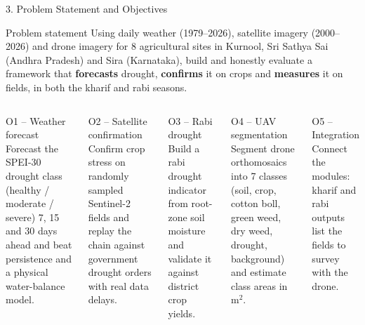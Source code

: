 \documentclass[aspectratio=169,10pt]{beamer}
\begin{document}
\begin{frame}{3. Problem Statement and Objectives}
\begin{card}{Problem statement}
\footnotesize Using daily weather (1979--2026), satellite imagery (2000--2026) and drone imagery for 8 agricultural sites in Kurnool, Sri Sathya Sai (Andhra Pradesh) and Sira (Karnataka), build and honestly evaluate a framework that \textbf{forecasts} drought, \textbf{confirms} it on crops and \textbf{measures} it on fields, in both the kharif and rabi seasons.
\end{card}
\begin{columns}[T,onlytextwidth]
\begin{card}{O1 -- Weather forecast}
\footnotesize Forecast the SPEI-30 drought class (healthy / moderate / severe) 7, 15 and 30 days ahead and beat persistence and a physical water-balance model.
\end{card}
\begin{card}{O2 -- Satellite confirmation}
\footnotesize Confirm crop stress on randomly sampled Sentinel-2 fields and replay the chain against government drought orders with real data delays.
\end{card}
\begin{card}{O3 -- Rabi drought}
\footnotesize Build a rabi drought indicator from root-zone soil moisture and validate it against district crop yields.
\end{card}
\begin{card}{O4 -- UAV segmentation}
\footnotesize Segment drone orthomosaics into 7 classes (soil, crop, cotton boll, green weed, dry weed, drought, background) and estimate class areas in m$^2$.
\end{card}
\begin{card}{O5 -- Integration}
\footnotesize Connect the modules: kharif and rabi outputs list the fields to survey with the drone.
\end{card}
\end{columns}
\end{frame}
\end{document}
